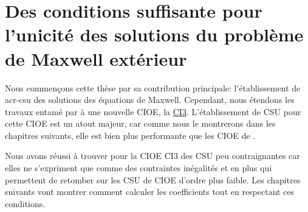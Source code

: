 \chapter[Des CSU des solutions du problème de Maxwell extérieur]{Des conditions suffisante pour l'unicité des solutions du problème de Maxwell extérieur}
\label{sec:csu}
\minitoc
\newpage
{}
Nous commençons cette thèse par sa contribution principale: l'établissement de \gls{acr-csu} des solutions des équations de Maxwell. Cependant, nous étendons les travaux entamé par \cite{stupfel_sufficient_2011} à une nouvelle CIOE, la \hyperlink{ci3}{CI3}. L'établissement de CSU pour cette CIOE est un atout majeur, car comme nous le montrerons dans les chapitres suivants, elle est bien plus performante que les CIOE de \cite{stupfel_sufficient_2011}.



Nous avons réussi à trouver pour la CIOE CI3 des CSU peu contraignantes car elles ne s'expriment que comme des contraintes inégalités et en plus qui permettent de retomber sur les CSU de CIOE d'ordre plus faible. Les chapitres suivants vont montrer comment calculer les coefficients tout en respectant ces conditions.